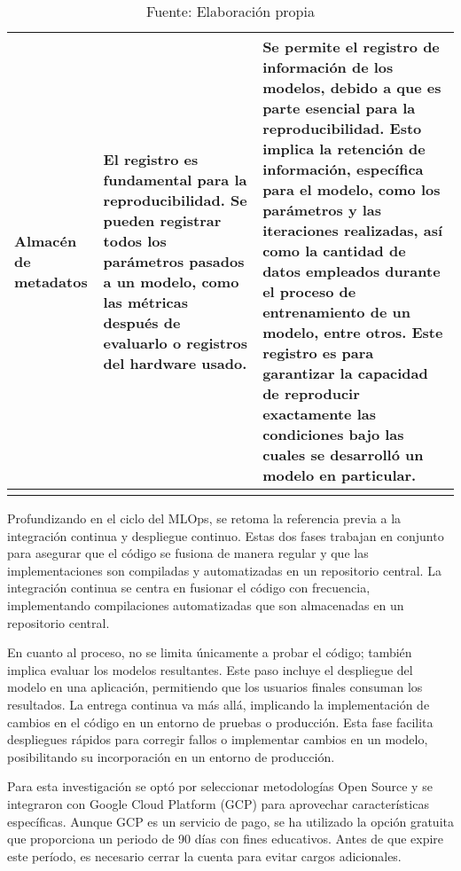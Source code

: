 \begin{longtable}{|p{3cm}|p{5cm}|p{6cm}|}
        \hline
        Almacén de metadatos & El registro es fundamental para la reproducibilidad. Se pueden registrar todos los parámetros pasados a un modelo, como las métricas después de evaluarlo o registros del hardware usado. & Se permite el registro de información de los modelos, debido a que es parte esencial para la reproducibilidad. Esto implica la retención de información, específica para el modelo, como los parámetros y las iteraciones realizadas, así como la cantidad de datos empleados durante el proceso de entrenamiento de un modelo, entre otros. Este registro es para garantizar la capacidad de reproducir exactamente las condiciones bajo las cuales se desarrolló un modelo en particular. \\
    \hline
    \caption*{\footnotesize Fuente: Elaboración propia}
    \label{tab:tabCicloMlops}
\end{longtable}

\newpage

Profundizando en el ciclo del MLOps, se retoma la referencia previa a la integración continua y despliegue continuo. Estas dos fases trabajan en conjunto para asegurar que el código se fusiona de manera regular y que las implementaciones son compiladas y automatizadas en un repositorio central. La integración continua se centra en fusionar el código con frecuencia, implementando compilaciones automatizadas que son almacenadas en un repositorio central. \newline

En cuanto al proceso, no se limita únicamente a probar el código; también implica evaluar los modelos resultantes. Este paso incluye el despliegue del modelo en una aplicación, permitiendo que los usuarios finales consuman los resultados. La entrega continua va más allá, implicando la implementación de cambios en el código en un entorno de pruebas o producción. Esta fase facilita despliegues rápidos para corregir fallos o implementar cambios en un modelo, posibilitando su incorporación en un entorno de producción. \newline

Para esta investigación se optó por seleccionar metodologías Open Source y se integraron  con Google Cloud Platform (GCP) para aprovechar características específicas. Aunque GCP es un servicio de pago, se ha utilizado la opción gratuita que proporciona un periodo de 90 días con fines educativos. Antes de que expire este período, es necesario cerrar la cuenta para evitar cargos adicionales. \newline

